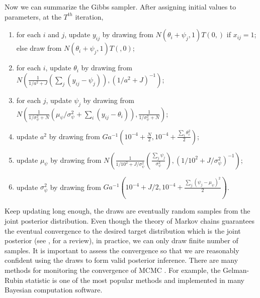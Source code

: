\documentclass[floatsintext, man]{apa7}
\begin{document}
Now we can summarize the Gibbs sampler. After assigning initial values to
parameters, at the $T^{th}$ iteration,
\begin{enumerate}
  \item for each $i$ and $j$, update $y_{ij}$ by drawing from $N(\theta_i +
  \psi_j, 1)T(0,)$ if $x_{ij} = 1$; else draw from $N(\theta_i + \psi_j, 1)T
  (,0)$;
  \item for each $i$, update $\theta_i$ by drawing from $N\left(\frac{1}{1/a^2 +
  J}(\sum_j (y_{ij} - \psi_j)), (1/a^2 + J)^{-1}\right)$;
  \item for each $j$, update $\psi_j$ by drawing from $N\left(\frac{1}
  {1/\sigma_\psi^2 + N}(\mu_\psi / \sigma_\psi^2 + \sum_i(y_{ij} -
  \theta_i)), \frac{1}{1/\sigma_\psi^2 + N}\right)$;
  \item update $a^2$ by drawing from $Ga^{-1}(10^{-4} + \frac{N}{2}, 10^{-4} +
  \frac{\sum_i \theta_i^2}{2})$;
  \item update $\mu_\psi$ by drawing from $N\left(\frac{1}{1/10^2 +
  J/\sigma_\psi^2}(\frac{\sum_j \psi_j}{\sigma_\psi^2}), (1 / 10^2 + J /
  \sigma_\psi^2)^{-1}\right)$;
  \item update $\sigma_\psi^2$ by drawing from $Ga^{-1}\left(10^{-4} + J
  / 2, 10^{-4} + \frac{\sum_j (\psi_j -\mu_\psi)^2}{2}\right)$.
\end{enumerate}
Keep updating long enough, the draws are eventually random samples from the
joint posterior distribution. Even though the theory of Markov chains guarantees
the eventual convergence to the desired target distribution which is the joint
posterior (see \cite{neal_probabilistic_1998}, for a review), in practice, we
can only draw finite number of samples. It is important to assess the
convergence so that we are reasonably confident using the draws to form valid
posterior inference. There are many methods for monitoring the convergence of
MCMC \parencite{cowles_markov_1996}. For example, the Gelman-Rubin statistic 
\parencite{gelman_inference_1992} is one of the most popular methods and
implemented in many Bayesian computation software.
\end{document}
